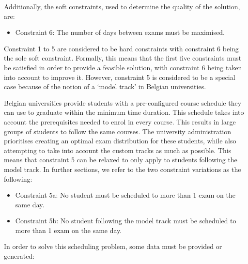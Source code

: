 Additionally, the soft constraints, used to determine the quality of the solution, are:
\begin{itemize}
    \item Constraint 6: The number of days between exams must be maximised.
\end{itemize}
Constraint 1 to 5 are considered to be hard constraints with constraint 6 being the sole soft constraint. Formally, this means that the first five constraints must be satisfied in order to provide a feasible solution, with constraint 6 being taken into account to improve it. However, constraint 5 is considered to be a special case because of the notion of a ‘model track’ in Belgian universities.

Belgian universities provide students with a pre-configured course schedule they can use to graduate within the minimum time duration. This schedule takes into account the prerequisites needed to enrol in every course. This results in large groups of students to follow the same courses. The university administration prioritises creating an optimal exam distribution for these students, while also attempting to take into account the custom tracks as much as possible. This means that constraint 5 can be relaxed to only apply to students following the model track. In further sections, we refer to the two constraint variations as the following:
\begin{itemize}
    \item Constraint 5a: No student must be scheduled to more than 1 exam on the same day.
    \item Constraint 5b: No student following the model track must be scheduled to more than 1 exam on the same day.

\end{itemize}

In order to solve this scheduling problem, some data must be provided or generated:


